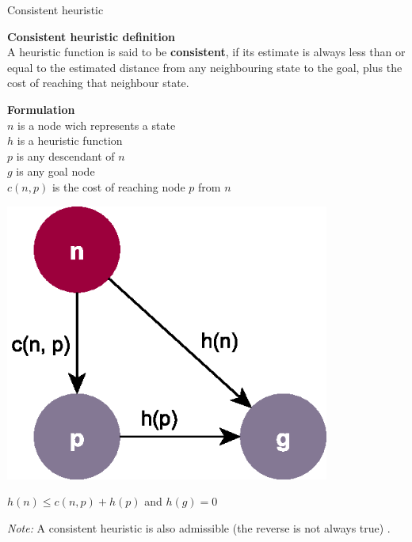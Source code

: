 \documentclass[9pt]{beamer}
\begin{document}
\begin{frame}{Consistent heuristic}
\begin{small}
\textbf{Consistent heuristic definition} \cite{Russell2002}\\
A heuristic function is said to be \textbf{consistent}, if its estimate is always less than or equal to the estimated distance from any neighbouring state to the goal, plus the cost of reaching that neighbour state.

\begin{minipage}[t]{0.65\linewidth}\vspace{0pt}%
\textbf{Formulation}\\
$n$ is a node wich represents a state\\
$h$ is a heuristic function\\
$p$ is any descendant of $n$\\
$g$ is any goal node\\
$c(n,p)$ is the cost of reaching node $p$ from $n$\\
\end{minipage}
\hskip5pt
\begin{minipage}[t]{0.30\linewidth}\vspace{0pt}%
    \begin{center}
    \includegraphics[keepaspectratio, width=0.8\textwidth]{images/consistent_h.eps}
    \end{center}
\end{minipage}

\begin{center}
    \textcolor{CS-1}{$h(n) \leq c(n,p) + h(p)$ and 
    $h(g) = 0$}
\end{center}


\emph{Note:} A consistent heuristic is also admissible (the reverse is not always true) \cite{Edelkamp2011}.
\end{small}
\end{frame}
\end{document}
